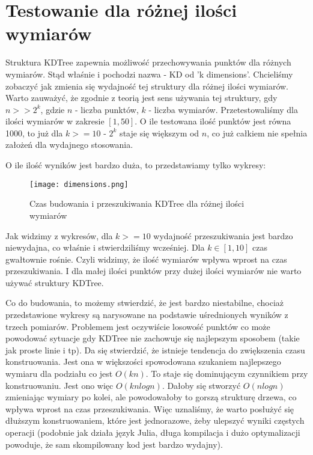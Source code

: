 \documentclass[a4paper, 12pt]{article}
\begin{document}
  \section{Testowanie dla różnej ilości wymiarów}
    \quad Struktura KDTree zapewnia możliwość przechowywania punktów dla różnych wymiarów. Stąd właśnie i pochodzi nazwa - KD od 'k dimensions'. Chcieliśmy zobaczyć jak zmienia się wydajność tej struktury dla różnej ilości wymiarów. Warto zauważyć, że zgodnie z teorią jest sens używania tej struktury, gdy $n >> 2^k$, gdzie $n$ - liczba punktów, $k$ - liczba wymiarów. Przetestowaliśmy dla ilości wymiarów w zakresie $[1, 50]$. O ile testowana ilość punktów jest równa 1000, to już dla $k >= 10$ - $2^k$ staje się większym od $n$, co już całkiem nie spełnia założeń dla wydajnego stosowania.

    \noindent
    \quad O ile ilość wyników jest bardzo duża, to przedstawiamy tylko wykresy:

    \begin{figure}[h!]
    \centering
      \texttt{[image: dimensions.png]}
      \caption{Czas budowania i przeszukiwania KDTree dla różnej ilości wymiarów}
    \end{figure}

    \noindent
    \quad Jak widzimy z wykresów, dla $k >= 10$ wydajność przeszukiwania jest bardzo niewydajna, co właśnie i stwierdziliśmy wcześniej. Dla $k \in [1, 10]$ czas gwałtownie rośnie. Czyli widzimy, że ilość wymiarów wpływa wprost na czas przeszukiwania. I dla małej ilości punktów przy dużej ilości wymiarów nie warto używać struktury KDTree.

    \noindent
    \quad Co do budowania, to możemy stwierdzić, że jest bardzo niestabilne, chociaż przedstawione wykresy są narysowane na podstawie uśrednionych wyników z trzech pomiarów. Problemem jest oczywiście losowość punktów co może powodować sytuacje gdy KDTree nie zachowuje się najlepszym sposobem (takie jak proste linie i tp). Da się stwierdzić, że istnieje tendencja do zwiększenia czasu konstruowania. Jest ona w większości spowodowana szukaniem najlepszego wymiaru dla podziału co jest $O(kn)$. To staje się dominującym czynnikiem przy konstruowaniu. Jest ono więc $O(knlogn)$. Dałoby się stworzyć $O(nlogn)$ zmieniając wymiary po kolei, ale powodowałoby to gorszą strukturę drzewa, co wpływa wprost na czas przeszukiwania. Więc uznaliśmy, że warto posłużyć się dłuższym konstruowaniem, które jest jednorazowe, żeby ulepszyć wyniki częstych operacji (podobnie jak działa język Julia, długa kompilacja i dużo optymalizacji powoduje, że sam skompilowany kod jest bardzo wydajny).
\end{document}
